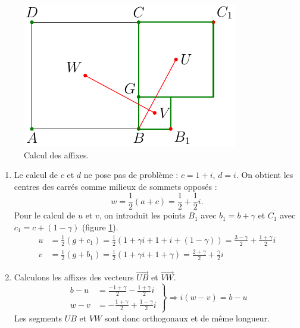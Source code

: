 \begin{figure}
 \centering
 \includegraphics{./Ccomp16_1.pdf}
 \caption{Calcul des affixes.}
 \label{fig:Ccomp16_1}
\end{figure}

\begin{enumerate}
 \item Le calcul de $c$ et $d$ ne pose pas de problème : $c = 1+i$, $d = i$.\newline
 On obtient les centres des carrés comme milieux de sommets opposés :
\begin{displaymath}
 w = \frac{1}{2}(a+c) = \frac{1}{2} + \frac{1}{2}i.
\end{displaymath}
Pour le calcul de $u$ et $v$, on introduit les points $B_1$ avec $b_1 = b +\gamma$ et $C_1$ avec $c_1 = c + (1-\gamma)$ (figure \ref{fig:Ccomp16_1}).
\begin{align*}
 u &= \frac{1}{2}(g+c_1)
 = \frac{1}{2}(1+\gamma i + 1 + i + (1-\gamma))
 = \frac{3-\gamma}{2} + \frac{1+\gamma}{2}i \\
v &= \frac{1}{2}(g + b_1)
 = \frac{1}{2}(1+\gamma i + 1 + \gamma)
 = \frac{2 + \gamma}{2} + \frac{\gamma}{2}i
\end{align*}

\item Calculons les affixes des vecteurs $\overrightarrow{UB}$ et $\overrightarrow{VW}$.
\begin{displaymath}
\left. 
\begin{aligned}
 b - u &= \frac{-1+\gamma}{2} - \frac{1+\gamma}{2}i \\
 w - v &= -\frac{1+\gamma}{2} + \frac{1-\gamma}{2}i
\end{aligned}
\right\rbrace 
\Rightarrow
i(w-v) = b-u
\end{displaymath}
Les segments $UB$ et $VW$ sont donc orthogonaux et de même longueur.
\end{enumerate}
